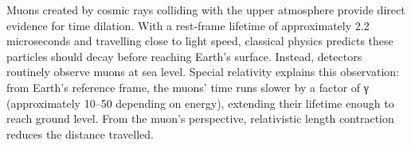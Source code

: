 Muons created by cosmic rays colliding with the upper atmosphere provide direct evidence for time dilation. With a rest-frame lifetime of approximately 2.2 microseconds and travelling close to light speed, classical physics predicts these particles should decay before reaching Earth's surface. Instead, detectors routinely observe muons at sea level. Special relativity explains this observation: from Earth's reference frame, the muons' time runs slower by a factor of γ (approximately 10–50 depending on energy), extending their lifetime enough to reach ground level. From the muon's perspective, relativistic length contraction reduces the distance travelled.
